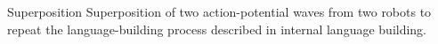 \begin{frame}[allowframebreaks]{Superposition}
    Superposition of two action-potential waves from two robots to repeat the language-building process described in internal language building.
\end{frame}